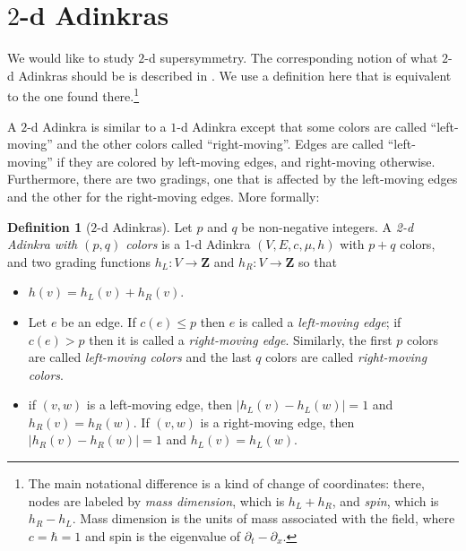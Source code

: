 \documentclass[12pt,twoside,singlespace]{article}
\numberwithin{equation}{section}
\theoremstyle{definition}
\newtheorem{definition}[equation]{Definition}
\newcommand{\ZZ}{\mathbf{Z}}
\begin{document}
\section{$2$-d Adinkras}
\label{sec:2d}
We would like to study $2$-d supersymmetry. The corresponding notion of what $2$-d Adinkras should be is described in \cite{gates:dimensional_extension,hubsch:weaving}.  We use a definition here that is equivalent to the one found there.\footnote{The main notational difference is a kind of change of coordinates: there, nodes are labeled by \emph{mass dimension}, which is $h_L+h_R$, and \emph{spin}, which is $h_R-h_L$.  Mass dimension is the units of mass associated with the field, where $c=\hbar=1$ and spin is the eigenvalue of $\partial_t-\partial_x$.}


A $2$-d Adinkra is similar to a $1$-d Adinkra except that some colors are called ``left-moving'' and the other colors called ``right-moving''.  Edges are called ``left-moving'' if they are colored by left-moving edges, and right-moving otherwise.  Furthermore, there are two gradings, one that is affected by the left-moving edges and the other for the right-moving edges. More formally:
\begin{definition}[$2$-d Adinkras]
Let $p$ and $q$ be non-negative integers. A \emph{2-d Adinkra with $(p,q)$ colors} is a 1-d Adinkra $(V,E,c,\mu,h)$ with $p+q$ colors, and two grading functions $h_L:V\to \ZZ$ and $h_R:V\to \ZZ$ so that
\begin{itemize}
\item $h(v)=h_L(v)+h_R(v)$.
\item Let $e$ be an edge.  If $c(e)\le p$ then $e$ is called a \emph{left-moving edge}; if $c(e)>p$ then it is called a \emph{right-moving edge}. Similarly, the first $p$ colors are called \emph{left-moving colors} and the last $q$ colors are called \emph{right-moving colors}.
\item if $(v,w)$ is a left-moving edge, then $|h_L(v)-h_L(w)|=1$ and $h_R(v)=h_R(w)$.  If $(v,w)$ is a right-moving edge, then $|h_R(v)-h_R(w)|=1$ and $h_L(v)=h_L(w)$.
\end{itemize}
\end{definition}
\end{document}
